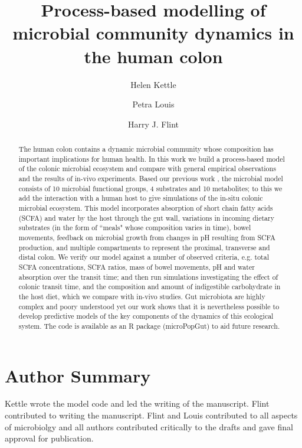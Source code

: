 \documentclass[a4paper]{article}
\title{Process-based modelling of microbial community dynamics in the human colon}
\author[1,*]{Helen Kettle}
\author[2]{Petra Louis}
\author[2]{Harry J. Flint}
\affil[1]{Biomathematics and Statistics Scotland, James Clerk Maxwell Building, Peter Guthrie Tait Road, Edinburgh, EH9 3FD}
\affil[2]{Gut Health Group, Rowett Institute, University of Aberdeen, Aberdeen, UK}
\affil[*]{Corresponding author: Helen.Kettle@bioss.ac.uk}
\begin{document}
\maketitle

\linenumbers


\begin{abstract}
The human colon contains a dynamic microbial community whose composition has important implications for human health. In this work we build a process-based model of the colonic microbial ecosystem and compare with general empirical observations and the results of in-vivo experiments.  
Based our previous work \citep{Kettle2015}, the microbial model consists of 10 microbial functional groups, 4 substrates and 10 metabolites; to this we add the interaction with a human host to give simulations of the in-situ colonic microbial ecosystem. 
This model incorporates absorption of short chain fatty acids (SCFA) and water by the host through the gut wall, variations in incoming dietary substrates (in the form of ``meals" whose composition varies in time), bowel movements, feedback on microbial growth from changes in pH resulting from SCFA production, and multiple compartments to represent the proximal, transverse and distal colon. 
We verify our model against a number of observed criteria, e.g. total SCFA concentrations, SCFA ratios, mass of bowel movements, pH and water absorption over the transit time; and then run simulations investigating the effect of colonic transit time, and the composition and amount of indigestible carbohydrate in the host diet, which we compare with in-vivo studies.
Gut microbiota are highly complex and poory understood yet our work shows that it is nevertheless possible to develop predictive models of the key components of the dynamics of this ecological system.
The code is available as an R package (microPopGut) to aid future research.
\end{abstract}

\section*{Author Summary}
Kettle wrote the model code and led the writing of the manuscript. Flint contributed to writing the manuscript. Flint and Louis contributed to all aspects of microbiolgy and all authors contributed critically to the drafts and gave final approval for publication.
\end{document}
